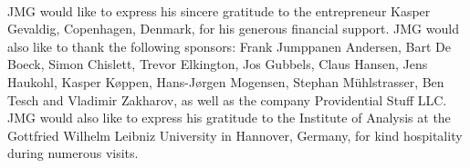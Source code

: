 \documentclass[letterpaper,11pt]{article}
\begin{document}
 

















\vspace{1cm}
\\


\noindent
JMG would like to express his sincere gratitude to the entrepreneur Kasper Gevaldig, Copenhagen, Denmark, for his generous financial support. JMG would also like to thank the following sponsors:  Frank Jumppanen Andersen, Bart De Boeck, Simon Chislett, Trevor Elkington, Jos Gubbels, Claus Hansen, Jens Haukohl, Kasper K\o ppen, Hans-J\o rgen Mogensen, Stephan M\"{u}hlstrasser, Ben Tesch and Vladimir Zakharov, as well as the company Providential Stuff LLC. JMG would also like to express his gratitude to the Institute of Analysis at the Gottfried Wilhelm Leibniz University in Hannover, Germany, for kind hospitality during numerous visits.
\end{document}
